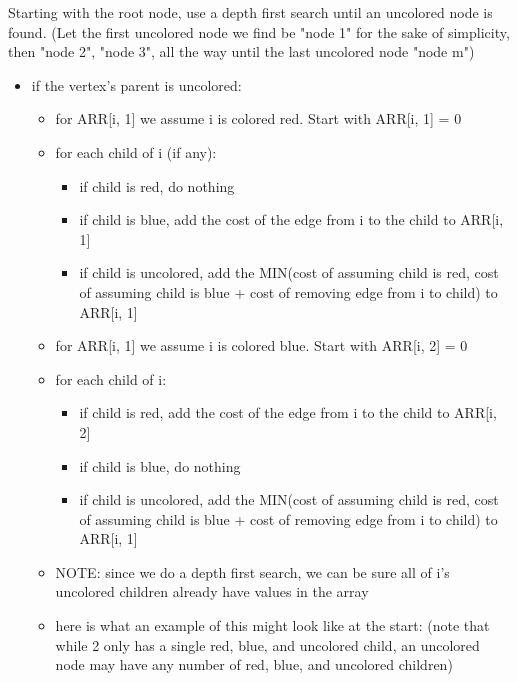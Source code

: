 \documentclass[a4paper]{article}
\begin{document}
Starting with the root node, use a depth first search until an uncolored node is found. (Let the first uncolored node we find be "node 1" for the sake of simplicity, then "node 2", "node 3", all the way until the last uncolored node "node m")

\begin{itemize}

    
    \item if the vertex's parent is uncolored:
    \begin{itemize}
        \item for ARR[i, 1] we assume i is colored red. Start with ARR[i, 1] = 0
        \item for each child of i (if any):
        \begin{itemize}
            \item if child is red, do nothing
            \item if child is blue, add the cost of the edge from i to the child to ARR[i, 1]
            \item if child is uncolored, add the MIN(cost of assuming child is red, cost of assuming child is blue + cost of removing edge from i to child) to ARR[i, 1]
        \end{itemize}
        \item for ARR[i, 1] we assume i is colored blue. Start with ARR[i, 2] = 0
        \item for each child of i:
        \begin{itemize}
            \item if child is red, add the cost of the edge from i to the child to ARR[i, 2]
            \item if child is blue, do nothing
            \item if child is uncolored, add the MIN(cost of assuming child is red, cost of assuming child is blue + cost of removing edge from i to child) to ARR[i, 1]
        \end{itemize}
        \item NOTE: since we do a depth first search, we can be sure all of i's uncolored children already have values in the array
        \item here is what an example of this might look like at the start: (note that while 2 only has a single red, blue, and uncolored child, an uncolored node may have any number of red, blue, and uncolored children)
    \end{itemize}
    

\end{itemize}
\end{document}
